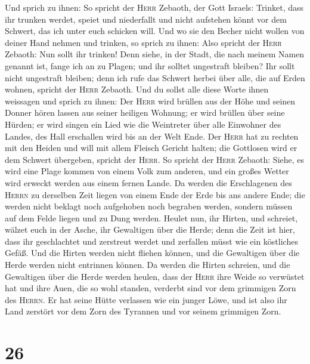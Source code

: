  Und sprich zu ihnen: So spricht der \textsc{Herr}
Zebaoth, der Gott Israels: Trinket, dass ihr trunken werdet, speiet und
niederfallt und nicht aufstehen könnt vor dem Schwert, das ich unter
euch schicken will.  Und wo sie den Becher nicht wollen
von deiner Hand nehmen und trinken, so sprich zu ihnen: Also spricht der
\textsc{Herr} Zebaoth: Nun sollt ihr trinken!  Denn
siehe, in der Stadt, die nach meinem Namen genannt ist, fange ich an zu
Plagen; und ihr solltet ungestraft bleiben? Ihr sollt nicht ungestraft
bleiben; denn ich rufe das Schwert herbei über alle, die auf Erden
wohnen, spricht der \textsc{Herr} Zebaoth.  Und du sollst
alle diese Worte ihnen weissagen und sprich zu ihnen: Der \textsc{Herr}
wird brüllen aus der Höhe und seinen Donner hören lassen aus seiner
heiligen Wohnung; er wird brüllen über seine Hürden; er wird singen ein
Lied wie die Weintreter über alle Einwohner des Landes, des Hall
erschallen wird bis an der Welt Ende.  Der \textsc{Herr}
hat zu rechten mit den Heiden und will mit allem Fleisch Gericht halten;
die Gottlosen wird er dem Schwert übergeben, spricht der \textsc{Herr}.
 So spricht der \textsc{Herr} Zebaoth: Siehe, es wird
eine Plage kommen von einem Volk zum anderen, und ein großes Wetter wird
erweckt werden aus einem fernen Lande.  Da werden die
Erschlagenen des \textsc{Herrn} zu derselben Zeit liegen von einem Ende
der Erde bis ans andere Ende; die werden nicht beklagt noch aufgehoben
noch begraben werden, sondern müssen auf dem Felde liegen und zu Dung
werden.  Heulet nun, ihr Hirten, und schreiet, wälzet
euch in der Asche, ihr Gewaltigen über die Herde; denn die Zeit ist
hier, dass ihr geschlachtet und zerstreut werdet und zerfallen müsst wie
ein köstliches Gefäß.  Und die Hirten werden nicht
fliehen können, und die Gewaltigen über die Herde werden nicht entrinnen
können.  Da werden die Hirten schreien, und die
Gewaltigen über die Herde werden heulen, dass der \textsc{Herr} ihre
Weide so verwüstet hat  und ihre Auen, die so wohl
standen, verderbt sind vor dem grimmigen Zorn des \textsc{Herrn}.
 Er hat seine Hütte verlassen wie ein junger Löwe, und
ist also ihr Land zerstört vor dem Zorn des Tyrannen und vor seinem
grimmigen Zorn.

\hypertarget{section-25}{%
\section{26}\label{section-25}}

